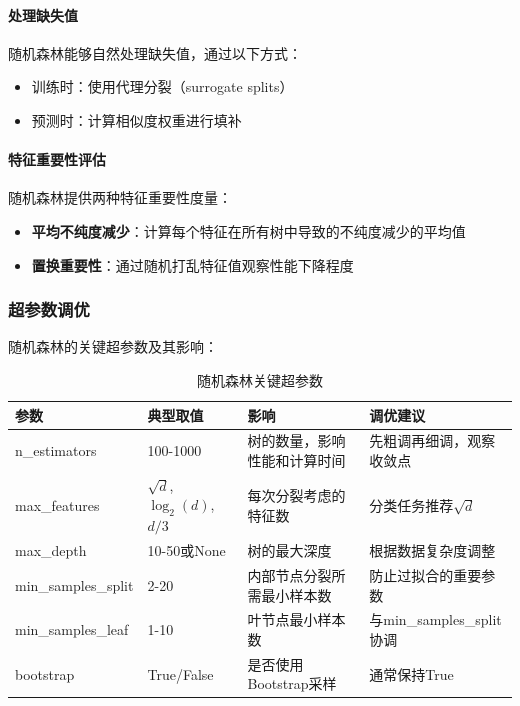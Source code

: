 \documentclass[UTF8]{report}
\theoremstyle{MyLineTheoremStyle} %
\theoremstyle{MyBlockTheoremStyle} %
\theoremstyle{MySubsubsectionStyle} %
\begin{document}
\paragraph{处理缺失值}
随机森林能够自然处理缺失值，通过以下方式：
\begin{itemize}
    \item 训练时：使用代理分裂（surrogate splits）
    \item 预测时：计算相似度权重进行填补
\end{itemize}

\paragraph{特征重要性评估}
随机森林提供两种特征重要性度量：
\begin{itemize}
    \item \textbf{平均不纯度减少}：计算每个特征在所有树中导致的不纯度减少的平均值
    \item \textbf{置换重要性}：通过随机打乱特征值观察性能下降程度
\end{itemize}

\subsubsection{超参数调优}

随机森林的关键超参数及其影响：

\begin{table}[h]
\centering
\caption{随机森林关键超参数}
\begin{tabular}{l p{3cm} p{4cm} p{3.5cm}}
\toprule
\textbf{参数} & \textbf{典型取值} & \textbf{影响} & \textbf{调优建议} \\
\midrule
n\_estimators & 100-1000 & 树的数量，影响性能和计算时间 & 先粗调再细调，观察收敛点 \\
max\_features & $\sqrt{d}$, $\log_2(d)$, $d/3$ & 每次分裂考虑的特征数 & 分类任务推荐$\sqrt{d}$ \\
max\_depth & 10-50或None & 树的最大深度 & 根据数据复杂度调整 \\
min\_samples\_split & 2-20 & 内部节点分裂所需最小样本数 & 防止过拟合的重要参数 \\
min\_samples\_leaf & 1-10 & 叶节点最小样本数 & 与min\_samples\_split协调 \\
bootstrap & True/False & 是否使用Bootstrap采样 & 通常保持True \\
\bottomrule
\end{tabular}
\end{table}
\end{document}
